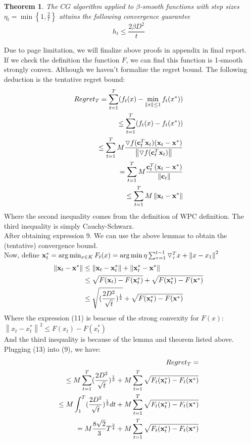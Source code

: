 \documentclass[12pt]{article}
\newtheorem{theorem}{Theorem}
\begin{document}
\begin{theorem}
     The $CG$ algorithm applied to $\beta$-smooth functions with step sizes $\eta_t=\min \left\{1, \frac{2}{t}\right\}$ attains the following convergence guarantee
$$
h_t \leq \frac{2 \beta D^2}{t}
$$
\end{theorem}
Due to page limitation, we will finalize above proofs in appendix in final report. If we check the definition the function $F$, we can find this function is 1-smooth strongly convex. Although we haven't formalize the regret bound. The following deduction is the tentative regret bound:
\begin{align}
Regret_T=\sum_{t=1}^{T}(f_t(x) - \min_{\left \| x \right \| \leq 1 }f_t(x^*)) \\
\leq \sum_{t=1}^{T} ( f_t(x) - f_t(x^*)) \\
\leq \sum_{t=1}^{T} M \frac{\triangledown f(\bold{c}_t^T\bold{x}_t)(\bold{x}_t - \bold{x^*}) }{\left \| \triangledown f(\bold{c}_t^T\bold{x}_t) \right \|} \\
= \sum_{t=1}^{T} M \frac{\bold{c}_t^T(\bold{x}_t-\bold{x}^*)}{\left \| \bold{c}_t \right \|} \\
\leq \sum_{t=1}^{T} M\left \| \bold{x}_t-\bold{x}^* \right \|
\end{align}
Where the second inequality comes from the definition of WPC definition. The third inequality is simply Cauchy-Schwarz.\\
After obtaining expression 9. We can use the above lemmas to obtain the (tentative) convergence bound.\\
Now, define $\bold{x}_t^*= \arg\min _{x \in K} F_t(x) = \arg\min\eta \sum_{\tau=1}^{t-1} \triangledown_{\tau}^Tx + \left \| x-x_1 \right \|^2$
\begin{align}
\left \| \bold{x}_t -\bold{x^*} \right \| & \leq  \left \| \bold{x}_t -\bold{x}_t^* \right \| + \left \| \bold{x}_t^*-\bold{x}^* \right \| \\
&\leq \sqrt{F(\bold{x}_t)-F(\bold{x}_t^*)}+ \sqrt{F(\bold{x}_t^*)-F(\bold{x}^*)} \\
&\leq \sqrt{(\frac{2D^2}{\sqrt{t}})^{\frac{1}{2}} } + \sqrt{ F(\bold{x}_t^*)-F(\bold{x}^*)} 
\end{align}
Where the expression (11) is beacuse of the strong convexity for $F(x)$: $ \left \| x_t - x_t^* \right \|^2 \leq F(x_t) - F(x_t^*)$\\
And the third inequality is because of the lemma and theorem listed above. Plugging (13) into (9), we have:
\begin{align}
Regret_T= \\
\leq M \sum_{t=1}^{T} (\frac{2D^2}{\sqrt{t}})^{\frac{1}{2}}+ M \sum_{t=1}^{T} \sqrt{F_t(\bold{x}_t^*)-F_t(\bold{x}^*)} \\
\leq M \int_{1}^{T}(\frac{2D^2}{\sqrt{t}})^{\frac{1}{2}} dt +  M \sum_{t=1}^{T} \sqrt{F_t(\bold{x}_t^*)-F_t(\bold{x}^*)} \\
= M \frac{8\sqrt{2}}{3} T^{\frac{3}{4}} + M \sum_{t=1}^{T} \sqrt{F_t(\bold{x}_t^*)-F_t(\bold{x}^*)} 
\end{align}
\end{document}
